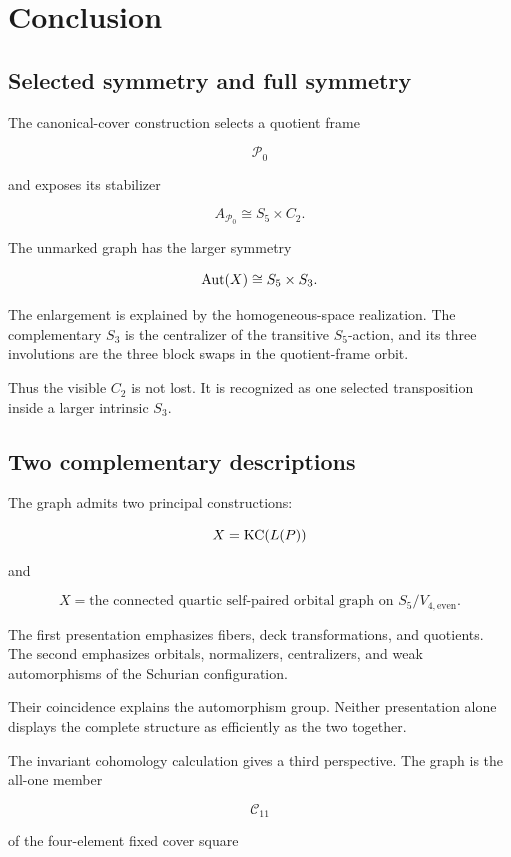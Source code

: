 \section{Conclusion}

\subsection{Selected symmetry and full symmetry}

The canonical-cover construction selects a quotient frame

\[
\mathcal P_0
\]

and exposes its stabilizer

\[
A_{\mathcal P_0}
\cong
S_5\times C_2.
\]

The unmarked graph has the larger symmetry

\[
\operatorname{Aut}(X)
\cong
S_5\times S_3.
\]

The enlargement is explained by the homogeneous-space realization. The
complementary \(S_3\) is the centralizer of the transitive \(S_5\)-action,
and its three involutions are the three block swaps in the quotient-frame
orbit.

Thus the visible \(C_2\) is not lost. It is recognized as one selected
transposition inside a larger intrinsic \(S_3\).

\subsection{Two complementary descriptions}

The graph admits two principal constructions:

\[
X=\operatorname{KC}(L(P))
\]

and

\[
X=
\text{the connected quartic self-paired orbital graph on }
S_5/V_{4,\mathrm{even}}.
\]

The first presentation emphasizes fibers, deck transformations, and
quotients. The second emphasizes orbitals, normalizers, centralizers, and
weak automorphisms of the Schurian configuration.

Their coincidence explains the automorphism group. Neither presentation
alone displays the complete structure as efficiently as the two together.

The invariant cohomology calculation gives a third perspective. The graph
is the all-one member

\[
\mathcal C_{11}
\]

of the four-element fixed cover square


